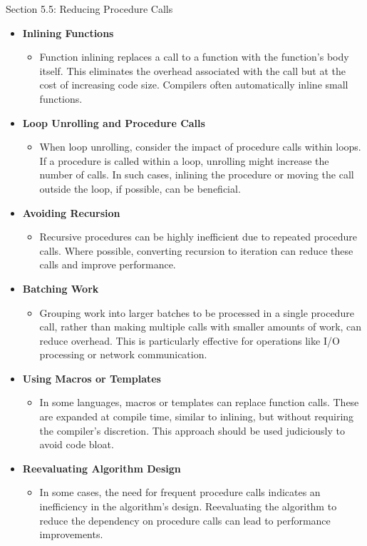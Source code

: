 \begin{notes}{Section 5.5: Reducing Procedure Calls}
    \begin{itemize}
        \item \textbf{Inlining Functions}
        \begin{itemize}
            \item Function inlining replaces a call to a function with the function's body itself. This eliminates the overhead associated with the call but at the cost of increasing code size. Compilers 
            often automatically inline small functions.
        \end{itemize}
        \item \textbf{Loop Unrolling and Procedure Calls}
        \begin{itemize}
            \item When loop unrolling, consider the impact of procedure calls within loops. If a procedure is called within a loop, unrolling might increase the number of calls. In such cases, inlining 
            the procedure or moving the call outside the loop, if possible, can be beneficial.
        \end{itemize}
        \item \textbf{Avoiding Recursion}
        \begin{itemize}
            \item Recursive procedures can be highly inefficient due to repeated procedure calls. Where possible, converting recursion to iteration can reduce these calls and improve performance.
        \end{itemize}
        \item \textbf{Batching Work}
        \begin{itemize}
            \item Grouping work into larger batches to be processed in a single procedure call, rather than making multiple calls with smaller amounts of work, can reduce overhead. This is particularly 
            effective for operations like I/O processing or network communication.
        \end{itemize}
        \item \textbf{Using Macros or Templates}
        \begin{itemize}
            \item In some languages, macros or templates can replace function calls. These are expanded at compile time, similar to inlining, but without requiring the compiler's discretion. This approach 
            should be used judiciously to avoid code bloat.
        \end{itemize}
        \item \textbf{Reevaluating Algorithm Design}
        \begin{itemize}
            \item In some cases, the need for frequent procedure calls indicates an inefficiency in the algorithm's design. Reevaluating the algorithm to reduce the dependency on procedure calls can 
            lead to performance improvements.
        \end{itemize}
    \end{itemize}
    

\end{notes}

